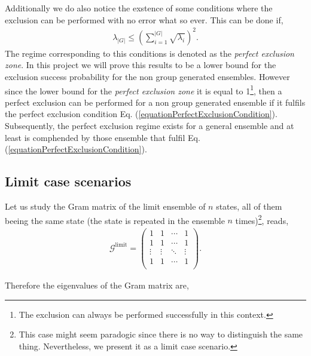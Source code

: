 \documentclass[12pt,letterpaper]{article}
\begin{document}
\begin{multicols}{2}
Additionally we do also notice the exstence of some conditions where the exclusion can be performed with no error what so ever. This can be done if,
\begin{align}\label{equationPerfectExclusionCondition}
	\lambda_{|G|}\leq \left(\sum_{i=1}^{|G|}\sqrt{\lambda_i}\right)^2.
\end{align}
The regime corresponding to this conditions is denoted as the \emph{perfect exclusion zone}. In this project we will prove this results to be a lower bound for the exclusion success probability for the non group generated ensembles. However since the lower bound for the \emph{perfect exclusion zone} it is equal to 1\footnote{The exclusion can always be performed successfully in this context.}, then a perfect exclusion can be performed for a non group generated ensemble if it fulfils the perfect exclusion condition Eq. (\ref{equationPerfectExclusionCondition}). Subsequently, the perfect exclusion regime exists for a general ensemble and at least is comphended by those ensemble that fulfil Eq. (\ref{equationPerfectExclusionCondition}).

\subsection{Limit case scenarios}\label{sectionLimitCaseScenarios}

Let us study the Gram matrix of the limit ensemble of $n$ states, all of them beeing the same state (the state is repeated in the ensemble $n$ times)\footnote{This case might seem paradogic since there is no way to distinguish the same thing. Nevertheless, we present it as a limit case scenario.}, reads,
\begin{align*}
	\mathcal{G}^{\text{limit}}= \begin{pmatrix}
 1 & 1 &\cdots & 1 \\
 1 & 1 & \cdots & 1 \\
 \vdots & \vdots & \ddots & \vdots \\
 1 & 1 & \cdots & 1 \\
\end{pmatrix}.
\end{align*}

Therefore the eigenvalues of the Gram matrix are,


\end{multicols}
\end{document}
